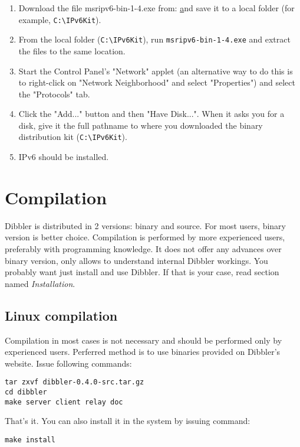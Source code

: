 \begin{enumerate}
  \item Download the file msripv6-bin-1-4.exe from:
    \href{http://research.microsoft.com/msripv6/msripv6.htm}
    and save it to a local folder (for example, \verb+C:\IPv6Kit+).
  \item From the local folder (\verb+C:\IPv6Kit+), run \verb+msripv6-bin-1-4.exe+ and extract the
    files to the same location.
  \item Start the Control Panel's "Network" applet (an alternative way to do this is
    to right-click on "Network Neighborhood" and select "Properties") and select
    the "Protocols" tab.
  \item Click the "Add..." button and then "Have Disk...". When it asks you for
    a disk, give it the full pathname to where you downloaded the binary
    distribution kit (\verb+C:\IPv6Kit+).
  \item IPv6 should be installed.
\end{enumerate}

\section{Compilation}
Dibbler is distributed in 2 versions: binary and source. For
most users, binary version is better choice.  Compilation is
performed by more experienced users, preferably with programming
knowledge. It does not offer any advances over binary version, only
allows to understand internal Dibbler workings. You probably want just
install and use Dibbler. If that is your case, read section
named \emph{Installation}.

\subsection{Linux compilation}

Compilation in most cases is not necessary and should be performed
only by experienced users. Perferred method is to use binaries
provided on Dibbler's website. Issue following commands:
\begin{verbatim}
tar zxvf dibbler-0.4.0-src.tar.gz
cd dibbler
make server client relay doc
\end{verbatim}
That's it. You can also install it in the system by issuing command:

\begin{verbatim}
make install
\end{verbatim}

